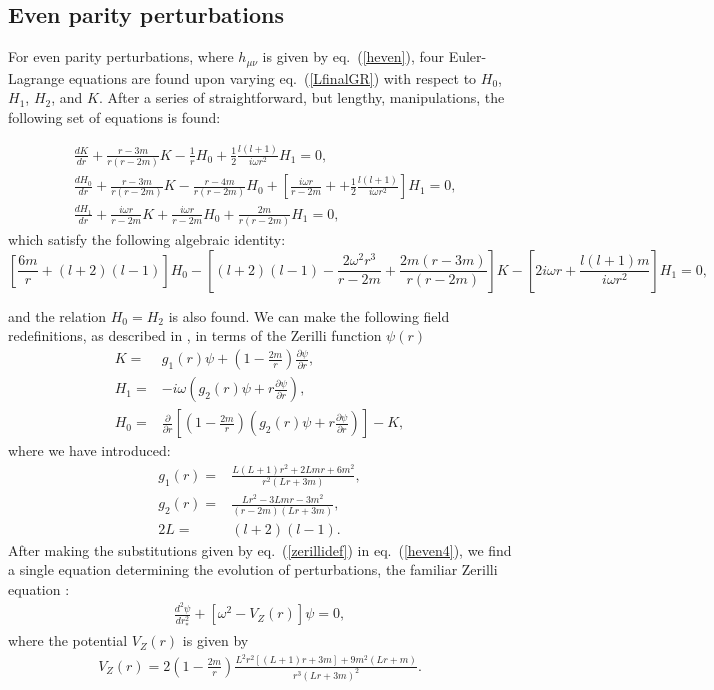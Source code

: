 \documentclass[10pt,twocolumn,preprintnumbers,amsmath,amssymb,nofootinbib
,superscriptaddress]{revtex4-1}
\begin{document}
\subsection{Even parity perturbations}
For even parity perturbations, where $h_{\mu\nu}$ is given by eq.~(\ref{heven}), four Euler-Lagrange equations are found upon varying eq.~(\ref{LfinalGR}) with respect to $H_0$, $H_1$, $H_2$, and $K$. After a series of straightforward, but lengthy, manipulations, the following set of equations is found:
\medskip
\begin{widetext}
\begin{align}
&\frac{d K}{d r}+\frac{r-3m}{r(r-2m)}K-\frac{1}{r}H_0+\frac{1}{2}\frac{l(l+1)}{i\omega r^2}H_1=0\label{heven1},\\
&\frac{d H_0}{d r}+\frac{r-3m}{r(r-2m)}K-\frac{r-4m}{r(r-2m)}H_0+\left[\frac{i\omega r}{r-2m}++\frac{1}{2}\frac{l(l+1)}{i\omega r^2}\right]H_1=0,\\
&\frac{d H_1}{d r}+\frac{i\omega r}{r-2m}K+\frac{i\omega r}{r-2m}H_0+\frac{2m}{r(r-2m)}H_1=0,
\end{align}
which satisfy the following algebraic identity:
\begin{equation}
\left[\frac{6m}{r}+(l+2)(l-1)\right]H_0-\left[(l+2)(l-1)-\frac{2\omega^2r^3}{r-2m}+\frac{2m(r-3m)}{r(r-2m)}\right]K-\left[2i\omega r+\frac{l(l+1)m}{i\omega r^2}\right]H_1=0\label{heven4},
\end{equation}
\end{widetext}
and the relation $H_0=H_2$ is also found. We can make the following field redefinitions, as described in \cite{Gleiser:2006yz}, in terms of the Zerilli function $\psi(r)$
\begin{align}
K=&g_1(r)\psi+\left(1-\frac{2m}{r}\right)\frac{\partial \psi}{\partial r},\nonumber\\
H_1=&-i\omega \left(g_2(r)\psi+r\frac{\partial \psi}{\partial r}\right),\nonumber\\
H_0=&\frac{\partial}{\partial r}\left[\left(1-\frac{2m}{r}\right)\left(g_2(r)\psi+r\frac{\partial \psi}{\partial r}\right)\right]-K,\label{zerillidef}
\end{align}
where we have introduced:
\begin{align}
g_1(r)=&\frac{L(L+1)r^2+2Lmr+6m^2}{r^2(Lr+3m)},\nonumber\\
g_2(r)=&\frac{Lr^2-3Lmr-3m^2}{(r-2m)(Lr+3m)},\nonumber\\
2L=&(l+2)(l-1).\label{evenauxfunctions}
\end{align}
After making the substitutions given by eq.~(\ref{zerillidef}) in eq.~(\ref{heven4}), we find a single equation determining the evolution of perturbations, the familiar Zerilli equation \cite{Zerilli:1970se}:
\begin{align}
\frac{d^2 \psi}{d r_\ast^2} + \left[\omega^2-V_Z(r)\right]\psi=0\label{zerilli},
\end{align}
where the potential $V_Z(r)$ is given by
\begin{align}
V_Z(r)=2\left(1-\frac{2m}{r}\right)\frac{L^2r^2\left[(L+1)r+3m\right]+9m^2(Lr+m)}{r^3(Lr+3m)^2}.\label{Vzerilli}
\end{align}
\end{document}
